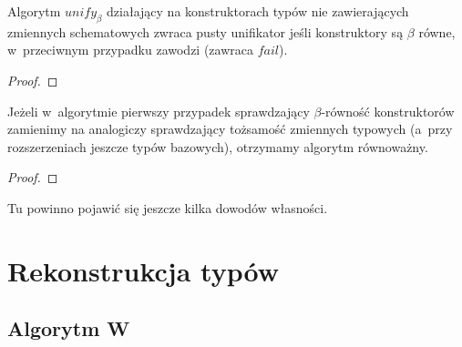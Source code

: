 \documentclass[11pt,leqno]{article}
\begin{document}
\begin{fakt}
Algorytm $unify_\beta$ działający na konstruktorach typów nie zawierających zmiennych schematowych
zwraca pusty unifikator jeśli konstruktory są $\beta$ równe, w~przeciwnym przypadku zawodzi (zawraca $fail$).
\end{fakt}
\begin{proof}
\end{proof}

\begin{fakt}
Jeżeli w~algorytmie pierwszy przypadek sprawdzający $\beta$-równość konstruktorów zamienimy na analogiczy 
sprawdzający tożsamość zmiennych typowych (a~przy rozszerzeniach jeszcze typów bazowych), otrzymamy algorytm
równoważny.
\end{fakt}
\begin{proof}
\end{proof}

Tu powinno pojawić się jeszcze kilka dowodów własności.

\section{Rekonstrukcja typów}

\subsection{Algorytm W}
\end{document}
